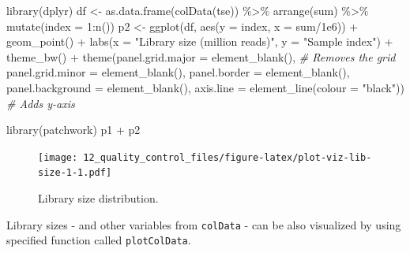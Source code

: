 \documentclass[
]{book}
\newenvironment{Shaded}{\begin{snugshade}}{\end{snugshade}}
\newcommand{\AttributeTok}[1]{\textcolor[rgb]{0.77,0.63,0.00}{#1}}
\newcommand{\CommentTok}[1]{\textcolor[rgb]{0.56,0.35,0.01}{\textit{#1}}}
\newcommand{\DecValTok}[1]{\textcolor[rgb]{0.00,0.00,0.81}{#1}}
\newcommand{\FloatTok}[1]{\textcolor[rgb]{0.00,0.00,0.81}{#1}}
\newcommand{\FunctionTok}[1]{\textcolor[rgb]{0.00,0.00,0.00}{#1}}
\newcommand{\NormalTok}[1]{#1}
\newcommand{\OtherTok}[1]{\textcolor[rgb]{0.56,0.35,0.01}{#1}}
\newcommand{\SpecialCharTok}[1]{\textcolor[rgb]{0.00,0.00,0.00}{#1}}
\newcommand{\StringTok}[1]{\textcolor[rgb]{0.31,0.60,0.02}{#1}}
\begin{document}
\begin{Shaded}
\begin{Highlighting}[]
\FunctionTok{library}\NormalTok{(dplyr)}
\NormalTok{df }\OtherTok{\textless{}{-}} \FunctionTok{as.data.frame}\NormalTok{(}\FunctionTok{colData}\NormalTok{(tse)) }\SpecialCharTok{\%\textgreater{}\%}
        \FunctionTok{arrange}\NormalTok{(sum) }\SpecialCharTok{\%\textgreater{}\%}
        \FunctionTok{mutate}\NormalTok{(}\AttributeTok{index =} \DecValTok{1}\SpecialCharTok{:}\FunctionTok{n}\NormalTok{())}
\NormalTok{p2 }\OtherTok{\textless{}{-}} \FunctionTok{ggplot}\NormalTok{(df, }\FunctionTok{aes}\NormalTok{(}\AttributeTok{y =}\NormalTok{ index, }\AttributeTok{x =}\NormalTok{ sum}\SpecialCharTok{/}\FloatTok{1e6}\NormalTok{)) }\SpecialCharTok{+}
        \FunctionTok{geom\_point}\NormalTok{() }\SpecialCharTok{+}  
        \FunctionTok{labs}\NormalTok{(}\AttributeTok{x =} \StringTok{"Library size (million reads)"}\NormalTok{, }\AttributeTok{y =} \StringTok{"Sample index"}\NormalTok{) }\SpecialCharTok{+}  
        \FunctionTok{theme\_bw}\NormalTok{() }\SpecialCharTok{+}
        \FunctionTok{theme}\NormalTok{(}\AttributeTok{panel.grid.major =} \FunctionTok{element\_blank}\NormalTok{(), }\CommentTok{\# Removes the grid}
          \AttributeTok{panel.grid.minor =} \FunctionTok{element\_blank}\NormalTok{(),}
          \AttributeTok{panel.border =} \FunctionTok{element\_blank}\NormalTok{(),}
          \AttributeTok{panel.background =} \FunctionTok{element\_blank}\NormalTok{(),}
          \AttributeTok{axis.line =} \FunctionTok{element\_line}\NormalTok{(}\AttributeTok{colour =} \StringTok{"black"}\NormalTok{)) }\CommentTok{\# Adds y{-}axis}

\FunctionTok{library}\NormalTok{(patchwork)}
\NormalTok{p1 }\SpecialCharTok{+}\NormalTok{ p2}
\end{Highlighting}
\end{Shaded}

\begin{figure}
\centering
\texttt{[image: 12\_quality\_control\_files/figure-latex/plot-viz-lib-size-1-1.pdf]}
\caption{\label{fig:plot-viz-lib-size-1}Library size distribution.}
\end{figure}

Library sizes - and other variables from \texttt{colData} - can be also visualized by using
specified function called \texttt{plotColData}.
\end{document}

